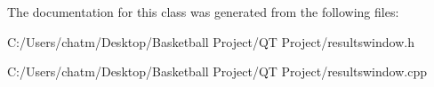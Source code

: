 The documentation for this class was generated from the following files\+:\begin{DoxyCompactItemize}
\item 
C\+:/\+Users/chatm/\+Desktop/\+Basketball Project/\+Q\+T Project/resultswindow.\+h\item 
C\+:/\+Users/chatm/\+Desktop/\+Basketball Project/\+Q\+T Project/resultswindow.\+cpp\end{DoxyCompactItemize}
